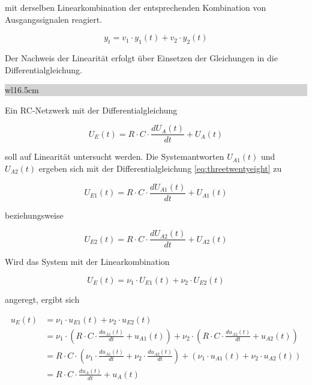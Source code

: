 \noindent mit derselben Linearkombination der entsprechenden Kombination von Ausgangssignalen reagiert.

\begin{equation}\label{eq:threetwentyseven}
y_{t} = v_{1}\cdot y_{1}(t) +v_{2}\cdot y_{2}(t)
\end{equation}

\noindent Der Nachweis der Linearität erfolgt über Einsetzen der Gleichungen in die Differentialgleichung.\bigskip

\noindent
\colorbox{lightgray}{%
%
\renewcommand\arraystretch{0.6}%
\begin{tabular}{ wl{16.5cm} }
{\selectfont{Beispiel: Linearität eines RC-Netzwerks} }
\end{tabular}%
}\bigskip

\noindent Ein RC-Netzwerk mit der Differentialgleichung

\begin{equation}\label{eq:threetwentyeight}
U_{E}(t) =R\cdot C\cdot \frac{dU_{A}(t)}{dt}+ U_{A}(t)
\end{equation}

\noindent soll auf Linearität untersucht werden. Die Systemantworten $U_{A1}(t)$ und $U_{A2}(t)$ ergeben sich mit der Differentialgleichung \ref{eq:threetwentyeight} zu

\begin{equation}\label{eq:threetwentynine}
U_{E1}(t) =R\cdot C\cdot \frac{dU_{A1}(t)}{dt}+ U_{A1}(t)
\end{equation}

\noindent beziehungsweise

\begin{equation}\label{eq:threethirty}
U_{E2}(t) =R\cdot C\cdot \frac{dU_{A2}(t)}{dt}+ U_{A2}(t)
\end{equation}

\noindent Wird das System mit der Linearkombination

\begin{equation}\label{eq:threethirtyone}
U_{E}(t) =\nu_{1}\cdot U_{E1}(t) +\nu_{2}\cdot U_{E2}(t)
\end{equation}

\noindent angeregt, ergibt sich

\begin{equation}\label{eq:threethirtytwo}
\begin{split} 
u_{E} \left(t\right) & = \nu _{1} \cdot u_{E1} \left(t\right)+\nu _{2} \cdot u_{E2} \left(t\right) \\ 
& = \nu _{1} \cdot \left(R\cdot C\cdot \frac{du_{A1} \left(t\right)}{dt} +u_{A1} \left(t\right)\right)+\nu _{2} \cdot \left(R\cdot C\cdot \frac{du_{A2} \left(t\right)}{dt} +u_{A2} \left(t\right)\right) \\ 
& = R\cdot C\cdot \left(\nu _{1} \cdot \frac{du_{A1} \left(t\right)}{dt} +\nu _{2} \cdot \frac{du_{A2} \left(t\right)}{dt} \right)+\left(\nu _{1} \cdot u_{A1} \left(t\right)+\nu _{2} \cdot u_{A2} \left(t\right)\right) \\ 
& = R\cdot C\cdot \frac{du_{A} \left(t\right)}{dt} +u_{A} \left(t\right) 
\end{split}
\end{equation}

